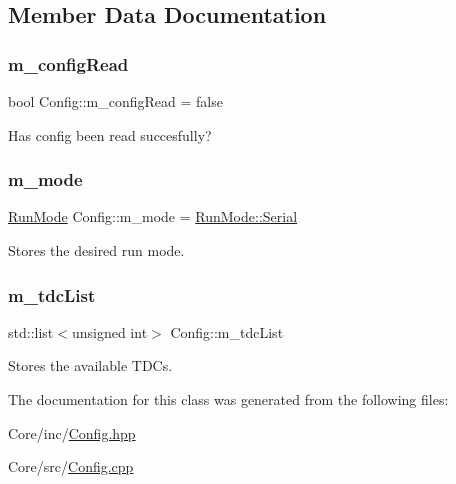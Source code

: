 \subsection{Member Data Documentation}
\mbox{\label{class_config_a82bcc998ae058699369aee4a189f0ad1}} 
\subsubsection{\texorpdfstring{m\+\_\+config\+Read}{m\_configRead}}
{\footnotesize\ttfamily bool Config\+::m\+\_\+config\+Read = false\hspace{0.3cm}{\ttfamily [private]}}



Has config been read succesfully? 

\mbox{\label{class_config_a65b1f233533ce1e2acd85f6a4a07c4d4}} 
\subsubsection{\texorpdfstring{m\+\_\+mode}{m\_mode}}
{\footnotesize\ttfamily \hyperlink{_modes_enum_8hpp_a3dfe11cf1a3a8121f6cd7fec4bf5947e}{Run\+Mode} Config\+::m\+\_\+mode = \hyperlink{_modes_enum_8hpp_a3dfe11cf1a3a8121f6cd7fec4bf5947eaab27270f353006b03c91367e05e44b94}{Run\+Mode\+::\+Serial}\hspace{0.3cm}{\ttfamily [private]}}



Stores the desired run mode. 

\mbox{\label{class_config_ac7295451d604cec09ed31ca74411c68c}} 
\subsubsection{\texorpdfstring{m\+\_\+tdc\+List}{m\_tdcList}}
{\footnotesize\ttfamily std\+::list$<$unsigned int$>$ Config\+::m\+\_\+tdc\+List\hspace{0.3cm}{\ttfamily [private]}}



Stores the available T\+D\+Cs. 



The documentation for this class was generated from the following files\+:\begin{DoxyCompactItemize}
\item 
Core/inc/\hyperlink{_config_8hpp}{Config.\+hpp}\item 
Core/src/\hyperlink{_config_8cpp}{Config.\+cpp}\end{DoxyCompactItemize}
